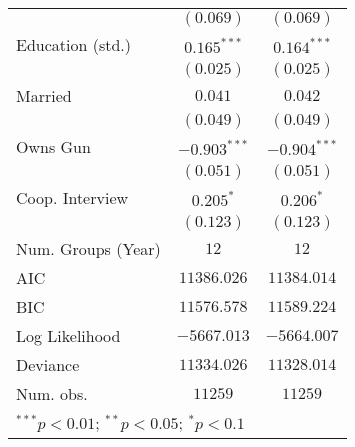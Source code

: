 \begin{table}
\begin{center}
\begin{tabular}{l c c}
                        & $(0.069)$      & $(0.069)$      \\
Education (std.)        & $0.165^{***}$  & $0.164^{***}$  \\
                        & $(0.025)$      & $(0.025)$      \\
Married                 & $0.041$        & $0.042$        \\
                        & $(0.049)$      & $(0.049)$      \\
Owns Gun                & $-0.903^{***}$ & $-0.904^{***}$ \\
                        & $(0.051)$      & $(0.051)$      \\
Coop. Interview         & $0.205^{*}$    & $0.206^{*}$    \\
                        & $(0.123)$      & $(0.123)$      \\
\midrule
Num. Groups (Year)      & $12$           & $12$           \\
AIC                     & $11386.026$    & $11384.014$    \\
BIC                     & $11576.578$    & $11589.224$    \\
Log Likelihood          & $-5667.013$    & $-5664.007$    \\
Deviance                & $11334.026$    & $11328.014$    \\
Num. obs.               & $11259$        & $11259$        \\
\bottomrule
\multicolumn{3}{l}{\scriptsize{$^{***}p<0.01$; $^{**}p<0.05$; $^{*}p<0.1$}}
\end{tabular}
\label{table_ate_logit}
\end{center}
\end{table}
